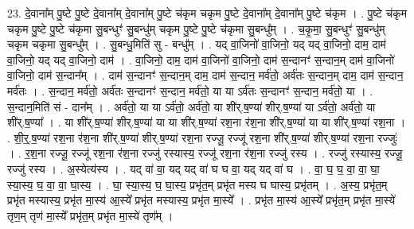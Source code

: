 \documentclass[17pt]{extarticle}
\begin{document}
23. दे॒वाना᳚म् पु॒ष्टे पु॒ष्टे दे॒वाना᳚म् दे॒वाना᳚म् पु॒ष्टे च॑कृम चकृम पु॒ष्टे दे॒वाना᳚म् दे॒वाना᳚म् पु॒ष्टे च॑कृम । . पु॒ष्टे च॑कृम चकृम पु॒ष्टे पु॒ष्टे च॑कृमा सु॒बन्धुꣳ॑ सु॒बन्धु॑म् चकृम पु॒ष्टे पु॒ष्टे च॑कृमा सु॒बन्धु᳚म् । . च॒कृ॒मा॒ सु॒बन्धुꣳ॑ सु॒बन्धु॑म् चकृम चकृमा सु॒बन्धु᳚म् । . सु॒बन्धु॒मिति॑ सु - बन्धु᳚म् । . यद् वा॒जिनो॑ वा॒जिनो॒ यद् यद् वा॒जिनो॒ दाम॒ दाम॑ वा॒जिनो॒ यद् यद् वा॒जिनो॒ दाम॑ । . वा॒जिनो॒ दाम॒ दाम॑ वा॒जिनो॑ वा॒जिनो॒ दाम॑ स॒न्दानꣳ॑ स॒न्दान॒म् दाम॑ वा॒जिनो॑ वा॒जिनो॒ दाम॑ स॒न्दान᳚म् । . दाम॑ स॒न्दानꣳ॑ स॒न्दान॒म् दाम॒ दाम॑ स॒न्दान॒ मर्व॑तो॒ अर्व॑तः स॒न्दान॒म् दाम॒ दाम॑ स॒न्दान॒ मर्व॑तः । . स॒न्दान॒ मर्व॑तो॒ अर्व॑तः स॒न्दानꣳ॑ स॒न्दान॒ मर्व॑तो॒ या या ऽर्व॑तः स॒न्दानꣳ॑ स॒न्दान॒ मर्व॑तो॒ या । . स॒न्दान॒मिति॑ सं - दान᳚म् । . अर्व॑तो॒ या या ऽर्व॑तो॒ अर्व॑तो॒ या शी॑र्.ष॒ण्या॑ शीर्.ष॒ण्या॑ या ऽर्व॑तो॒ अर्व॑तो॒ या शी॑र्.ष॒ण्या᳚ । . या शी॑र्.ष॒ण्या॑ शीर्.ष॒ण्या॑ या या शी॑र्.ष॒ण्या॑ रश॒ना र॑श॒ना शी॑र्.ष॒ण्या॑ या या शी॑र्.ष॒ण्या॑ रश॒ना । . शी॒र्॒.ष॒ण्या॑ रश॒ना र॑श॒ना शी॑र्.ष॒ण्या॑ शीर्.ष॒ण्या॑ रश॒ना रज्जू॒ रज्जू॑ रश॒ना शी॑र्.ष॒ण्या॑ शीर्.ष॒ण्या॑ रश॒ना रज्जुः॑ । . र॒श॒ना रज्जू॒ रज्जू॑ रश॒ना र॑श॒ना रज्जु॑ रस्यास्य॒ रज्जू॑ रश॒ना र॑श॒ना रज्जु॑ रस्य । . रज्जु॑ रस्यास्य॒ रज्जू॒ रज्जु॑ रस्य । . अ॒स्येत्य॑स्य । . यद् वा॑ वा॒ यद् यद् वा॑ घ घ वा॒ यद् यद् वा॑ घ । . वा॒ घ॒ घ॒ वा॒ वा॒ घा॒ स्या॒स्य॒ घ॒ वा॒ वा॒ घा॒स्य॒ । . घा॒ स्या॒स्य॒ घ॒ घा॒स्य॒ प्रभृ॑त॒म् प्रभृ॑त मस्य घ घास्य॒ प्रभृ॑तम् । . अ॒स्य॒ प्रभृ॑त॒म् प्रभृ॑त मस्यास्य॒ प्रभृ॑त मा॒स्य॑ आ॒स्ये᳚ प्रभृ॑त मस्यास्य॒ प्रभृ॑त मा॒स्ये᳚ । . प्रभृ॑त मा॒स्य॑ आ॒स्ये᳚ प्रभृ॑त॒म् प्रभृ॑त मा॒स्ये॑ तृण॒म् तृण॑ मा॒स्ये᳚ प्रभृ॑त॒म् प्रभृ॑त मा॒स्ये॑ तृण᳚म् । \newline
\end{document}
